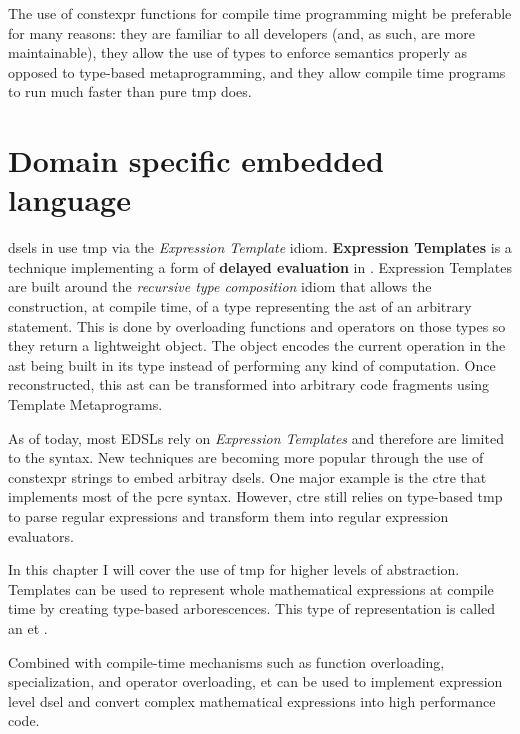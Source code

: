 \documentclass[../main]{subfiles}
\begin{document}
The use of \gls{constexpr} functions for compile time programming might be
preferable for many reasons: they are familiar to all \cpp developers
(and, as such, are more maintainable), they allow the use of types to enforce
semantics properly as opposed to type-based metaprogramming, and they allow
compile time programs to run much faster than pure \gls{tmp} does.

\section{
  Domain specific embedded language
}
\label{lbl:expression-level-metaprogramming}


\glspl{dsel} in \cpp use \gls{tmp} via the \textit{Expression Template} idiom.
\textbf{Expression Templates} \cite{veldhuizen:1995,vandevoorde:2002} is a
technique implementing a form of \textbf{delayed evaluation} in
\cpp \cite{spinellis:2001}. Expression Templates are built around the
\textit{recursive type composition} idiom \cite{jarvi:1998} that allows the
construction, at compile time, of a type representing the \gls{ast}
of an arbitrary statement. This is done by overloading functions and operators
on those types so they return a lightweight object.
The object encodes the current operation in the \gls{ast}
being built in its type instead of performing any kind of computation.
Once reconstructed, this \gls{ast} can be transformed into arbitrary code fragments
using Template Metaprograms.

As of today, most \cpp EDSLs rely on \textit{Expression Templates} and therefore
are limited to the \cpp syntax. New techniques are becoming more popular through
the use of \gls{constexpr} strings to embed arbitray
\glspl{dsel}. One major example is the \gls{ctre} \cite{ctre}
that implements most of the \gls{pcre} syntax.
However, \gls{ctre} still relies on type-based \gls{tmp} to parse
regular expressions and transform them into regular expression evaluators.

In this chapter I will cover the use of \gls{tmp} for higher levels
of abstraction. Templates can be used to represent whole mathematical
expressions at compile time by creating type-based arborescences.
This type of representation is called an \gls{et} \cite{veldhuizen:1995}.

Combined with compile-time mechanisms such as function overloading,
specialization, and operator overloading, \gls{et}\acrpluralsuffix{} can be used to
implement expression level \gls{dsel}\acrpluralsuffix{} and convert complex
mathematical expressions into high performance code.
\end{document}
